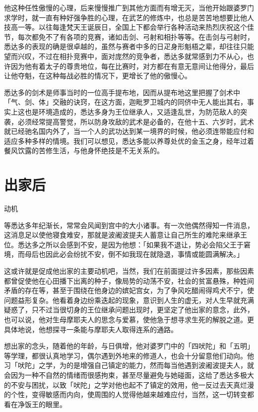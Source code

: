 \documentclass[12pt,twoside,openany]{book}
\begin{document}
他这种任性傲慢的心理，后来慢慢推广到其他方面而有增无灭，当他开始跟婆罗门求学时，就一直有种好强争胜的心理，在武艺的修炼中，也总是苦苦地想要比他人技高一等。以往每逢梵天王诞辰日，全国上下都会举行各种活动来热烈庆祝这个佳节，每次都免不了有各项的竞赛，诸如击剑、弓射和相扑等等。在击剑与弓射时，悉达多的表现的确是很卓越的，虽然与赛者中多的日疋身形魁梧之辈，却往往只能望而兴叹，不过在相扑竞赛中，面对庞然的竞争者，悉达多就常感到力不从心，也许因为他有着太子的尊贵地位，每在比赛时，对方都在有意无意间让他得分，最后让他夺魁，在这种每战必胜的情况下，更增长了他的傲慢心。

悉达多的剑术是师事当时的一位高手提布地，因而从提布地这里把握了剑术中「气、剑、体」交融的诀窍，在这方面，迦毗罗卫城内的同侪中无人能出其右，事实上这也是环境造成的，悉达多身为王位继承人，又适逢乱世，为防范敌人的突袭，必须经常提高警觉，所以防身攻敌的武术是必备的，在他十五、六岁时，武术就已经驰名国内外了，当一个人的武功达到某一境界的时候，他必须连带能应付和适应多种多样的情境。我们可以想见，悉达多能以养尊处优的金玉之身，经年过着餐风饮露的苦修生活，与他身怀绝技是不无关系的。

\section{出家后}\label{sec1.13}

动机

等悉达多年纪渐长，常常会风闻到宫中的大小诸事。有一次他偶然得知一件消息，这消息足以使他寝食难安，那就是波阇波提夫人蓄意让自己所生的难陀来继承王位。悉达多之所以会感到不安，是因为他想：「如果我不退让，势必会陷父王于窘境，而母后也因此必会纷扰不安，倒不如我现在就隐退，事情或能圆满解决。」

这或许就是促成他出家的主要动机吧，当然，我们在前面提过许多因素，那些因素都曾促使他在心田播下出离的种子，像局势的动荡不安，社会的贫富悬殊，种姓间矛盾的存在等，甚至于围绕在他身边的嫔妃宫女，为了争风吃醋闹得鸡犬不宁，使问题益形复杂。他看着身边纷乘迭起的现象，意识到人生的虚无，对人生早就充满疑惑了，只不过当很切身的王位继承问题出现时，更坚定了他出家的意念，此外，也可以说，他对生母摩耶夫人的思念与爱慕，使他急于想寻求生死的解脱之道。更具体地说，他想探寻一条能与摩耶夫人取得连系的通路。

想出家的念头，随着他的年龄，与日俱增，他对婆罗门中的「四吠陀」和「五明」等学理，都很认真地学习，偶尔遇到外地来的修道人，也会十分留意他们动向。他习「吠陀」之学，为的是增强自己镇定的能力，然而每当他遇到波阇波提夫人，就会因为一种不自然的情绪而很感拘束，甚至尽量避免与她碰面，这给了悉达多极大的不安与困扰，以致「吠陀」之学对他也起不了镇定的效用，他一反过去天真烂漫的个性，变得敏感而内向，使周围的人觉得他越来越难应付，当然，这一切转变都看在净饭王的眼里。
\end{document}

